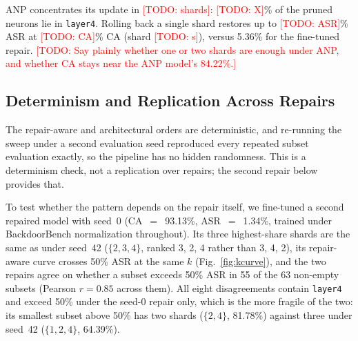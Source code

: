 \documentclass[conference,a4paper]{IEEEtran}  %
\newcommand{\todo}[1]{\textcolor{red}{[TODO: #1]}}
\newif\ifrepairseed      \repairseedtrue    %
\newcommand{\ANPca}{84.22}          %
\begin{document}
ANP concentrates its update in \todo{shards}: \todo{X}\% of the pruned
neurons lie in \texttt{layer4}. Rolling back a single shard restores up to
\todo{ASR}\% ASR at \todo{CA}\% CA (shard \todo{s}), versus 5.36\% for the
fine-tuned repair. \todo{Say plainly whether one or two shards are enough
under ANP, and whether CA stays near the ANP model's \ANPca\%.}
\fi

\subsection{Determinism and Replication Across Repairs}
\label{sec:variance}

The repair-aware and architectural orders are deterministic, and re-running the sweep under a second evaluation seed reproduced every repeated subset evaluation exactly, so the pipeline has no hidden randomness. This is a determinism check, not a replication over repairs; the second repair below provides that.
\ifrepairseed
To test whether the pattern depends on the repair itself, we fine-tuned a second repaired model with seed~0 (CA~$=$~93.13\%, ASR~$=$~1.34\%, trained under BackdoorBench normalization throughout). Its three highest-share shards are the same as under seed~42 ($\{2,3,4\}$, ranked 3, 2, 4 rather than 3, 4, 2), its repair-aware curve crosses 50\% ASR at the same $k$ (Fig.~\ref{fig:kcurve}), and the two repairs agree on whether a subset exceeds 50\% ASR in 55 of the 63 non-empty subsets (Pearson $r=0.85$ across them). All eight disagreements contain \texttt{layer4} and exceed 50\% under the seed-0 repair only, which is the more fragile of the two: its smallest subset above 50\% has two shards ($\{2,4\}$, 81.78\%) against three under seed~42 ($\{1,2,4\}$, 64.39\%).
\fi
\end{document}
